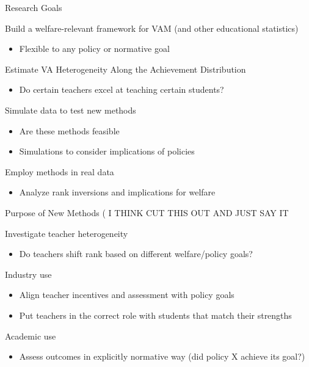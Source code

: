 \documentclass[t,aspectratio=169,11pt]{beamer}
\newenvironment{wideenumerate}{\enumerate\addtolength{\itemsep}{14pt}}{\endenumerate}
\begin{document}
\begin{frame}{Research Goals}

\begin{wideenumerate}
     \item Build a welfare-relevant framework for VAM (and other educational statistics) 
     \begin{itemize}
         \item Flexible to any policy or normative goal 
     \end{itemize}
    \item Estimate VA Heterogeneity Along the Achievement Distribution
    \begin{itemize}
        \item Do certain teachers excel at teaching certain students? 
    \end{itemize}
    \item Simulate data to test new methods
    \begin{itemize}
        \item Are these methods feasible 
        \item Simulations to consider implications of policies
    \end{itemize}
    \item Employ methods in real data
    \begin{itemize}
        \vspace{2mm}
    	\setlength{\itemsep}{2mm}
        \item Analyze rank inversions and implications for welfare
    \end{itemize}  

\end{wideenumerate}
\end{frame}

\begin{frame}{Purpose of New Methods ( I THINK CUT THIS OUT AND JUST SAY IT}
\begin{wideenumerate}
    \item Investigate teacher heterogeneity 
        \begin{itemize}
            \item Do teachers shift rank based on different welfare/policy goals? 
        \end{itemize}
    \item Industry use
    \begin{itemize}
        \item Align teacher incentives and assessment with policy goals 
        \item Put teachers in the correct role with students that match their strengths
    \end{itemize}
    \item Academic use 
        \begin{itemize}
            \item Assess outcomes in explicitly normative way (did policy X achieve its goal?) 
        \end{itemize}
\end{wideenumerate}
\end{frame}
\end{document}
